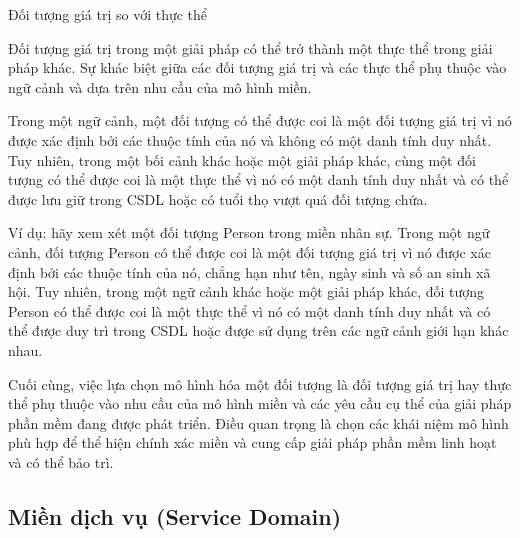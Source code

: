 Đối tượng giá trị so với thực thể

Đối tượng giá trị trong một giải pháp có thể trở thành một thực thể trong giải pháp khác. Sự khác biệt giữa các đối tượng giá trị và các thực thể phụ thuộc vào ngữ cảnh và dựa trên nhu cầu của mô hình miền.

Trong một ngữ cảnh, một đối tượng có thể được coi là một đối tượng giá trị vì nó được xác định bởi các thuộc tính của nó và không có một danh tính duy nhất. Tuy nhiên, trong một bối cảnh khác hoặc một giải pháp khác, cùng một đối tượng có thể được coi là một thực thể vì nó có một danh tính duy nhất và có thể được lưu giữ trong CSDL hoặc có tuổi thọ vượt quá đối tượng chứa.

Ví dụ: hãy xem xét một đối tượng Person trong miền nhân sự. Trong một ngữ cảnh, đối tượng Person có thể được coi là một đối tượng giá trị vì nó được xác định bởi các thuộc tính của nó, chẳng hạn như tên, ngày sinh và số an sinh xã hội. Tuy nhiên, trong một ngữ cảnh khác hoặc một giải pháp khác, đối tượng Person có thể được coi là một thực thể vì nó có một danh tính duy nhất và có thể được duy trì trong CSDL hoặc được sử dụng trên các ngữ cảnh giới hạn khác nhau.

Cuối cùng, việc lựa chọn mô hình hóa một đối tượng là đối tượng giá trị hay thực thể phụ thuộc vào nhu cầu của mô hình miền và các yêu cầu cụ thể của giải pháp phần mềm đang được phát triển. Điều quan trọng là chọn các khái niệm mô hình phù hợp để thể hiện chính xác miền và cung cấp giải pháp phần mềm linh hoạt và có thể bảo trì.




\subsection{Miền dịch vụ (Service Domain)}




